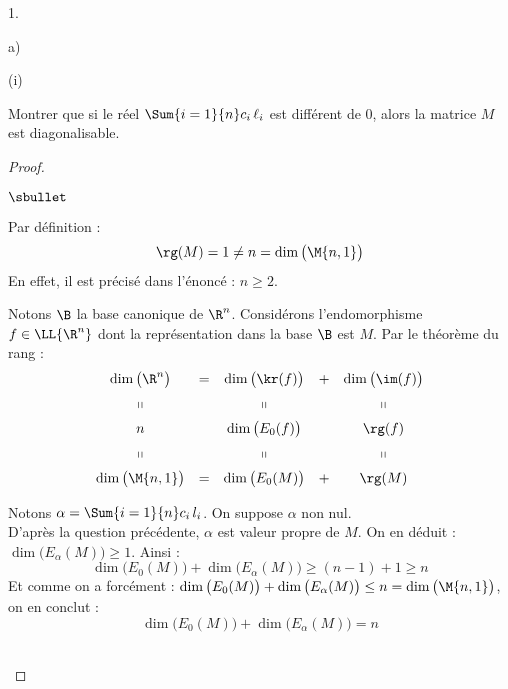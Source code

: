 \documentclass[11pt]{article}%
\begin{document}
\begin{noliste}{1.}
\begin{noliste}{a)}
\begin{nonoliste}{(i)}
    \item Montrer que si le réel $\Sum{i=1}{n} c_i \, \ell_i$ est
      différent de $0$, alors la matrice $M$ est diagonalisable.

      \begin{proof}~%
        \begin{noliste}{$\sbullet$}
        \item Par définition :
          \[
          \rg(M) = 1 \neq n = \dim\big( \M{n, 1} \big)
          \]
          En effet, il est précisé dans l'énoncé : $n \geq 2$. %

        \item Notons $\B$ la base canonique de $\R^n$. Considérons
          l'endomorphisme $f \in \LL{\R^n}$ dont la représentation
          dans la base $\B$ est $M$. Par le théorème du rang :
          \[
          \begin{array}{ccccc}
            \dim\big( \R^n \big) & = & \dim\big( \kr(f) \big) & + &
            \dim\big( \im(f) \big)
            \\[.2cm]
            \shortparallel & & \shortparallel & & \shortparallel
            \\[.2cm]
            n & & \dim\big(  E_0(f) \big) & & \rg(f)
            \\[.2cm]
            \shortparallel & & \shortparallel & & \shortparallel
            \\[.2cm]
            \dim\big( \M{n,1} \big) & = & \dim\big( E_0(M) \big) & + & 
            \rg(M)
          \end{array}
          \]

        \item Notons $\alpha = \Sum{i=1}{n} c_i \, l_i$. On suppose
          $\alpha$ non nul.\\
          D'après la question précédente, $\alpha$ est valeur propre
          de $M$. On en déduit : $\dim\big( E_{\alpha}(M) \big) \geq
          1$. Ainsi :
          \[
          \dim\big( E_{0}(M) \big) + \dim\big( E_{\alpha}(M) \big)
          \geq (n-1) + 1 \geq n
          \]
          Et comme on a forcément : $\dim\big( E_{0}(M) \big) +
          \dim\big( E_{\alpha}(M) \big) \leq n = \dim\big( \M{n,1}
          \big)$, on en conclut :
          \[
          \dim\big( E_{0}(M) \big) + \dim\big( E_{\alpha}(M) \big) = n
          \]
        \end{noliste}
        ~\\[-1cm]
      \end{proof}
    \end{nonoliste}



\end{noliste}
\end{noliste}
\end{document}
